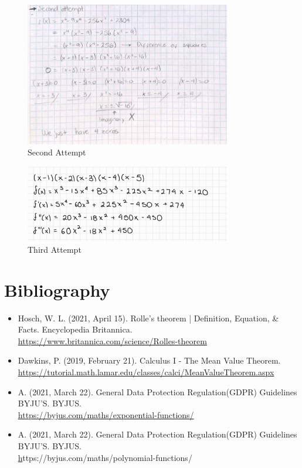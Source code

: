 \documentclass{article}
\begin{document}
    \begin{figure}[H]
        \includegraphics[width=340px]{img/secondattempt.png}
        \caption{Second Attempt}
    \end{figure}

    \begin{figure}[H]
        \includegraphics[width=340px]{img/thirdattempt.png}
        \caption{Third Attempt}
    \end{figure}

    \pagebreak
    \section{Bibliography}
    \begin{itemize}
        \item Hosch, W. L. (2021, April 15). Rolle’s theorem | Definition, Equation, \& Facts. Encyclopedia Britannica. \\
        \href{https://www.britannica.com/science/Rolles-theorem}{https://www.britannica.com/science/Rolles-theorem}

        \item Dawkins, P. (2019, February 21). Calculus I - The Mean Value Theorem. \\
        \href{https://tutorial.math.lamar.edu/classes/calci/MeanValueTheorem.aspx}{https://tutorial.math.lamar.edu/classes/calci/MeanValueTheorem.aspx}

        \item A. (2021, March 22). General Data Protection Regulation(GDPR) Guidelines BYJU’S. BYJUS. \\
        \href{https://byjus.com/maths/exponential-functions/}{https://byjus.com/maths/exponential-functions/}

        \item A. (2021, March 22). General Data Protection Regulation(GDPR) Guidelines BYJU’S. BYJUS.\\
        \href{https://byjus.com/maths/polynomial-functions/}https://byjus.com/maths/polynomial-functions/{}
    \end{itemize}
\end{document}
